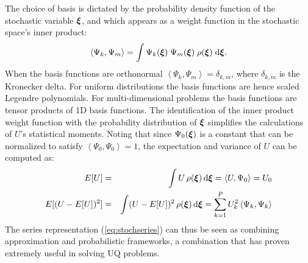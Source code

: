 The choice of basis is dictated by the probability density
function of the stochastic variable $\xxi$, and which appears as a weight
function in the stochastic space's inner product:
\begin{equation}
 \left<\Psi_k,\Psi_m\right> = \int \Psi_k(\xxi) \;\Psi_m(\xxi) \; \rho(\xxi) \; \mbox{d}\xxi.
\end{equation}
When the basis functions are orthonormal $\left<\Psi_k,\Psi_m\right>=\delta_{k,m}$, where
$\delta_{k,m}$ is the Kronecker delta.
For uniform
distributions the basis functions are hence scaled Legendre polynomials.
For multi-dimensional problems the basis functions are
tensor products of 1D basis functions. The identification of the inner product weight function
with the probability distribution of $\xxi$ simplifies the calculations of $U$'s statistical moments.
Noting that since $\Psi_0(\xxi)$ is a constant that can be normalized to satisfy 
$\left<\Psi_0,\Psi_0\right>=1$, the expectation and variance of $U$ can be computed as:
\begin{eqnarray}
 E[U]&=&\int U \, \rho(\xxi) \, \mbox{d}\xxi=\left< U,\Psi_0\right> = U_0 \\
 E[(U-E[U])^2]&=&\int (U-E[U])^2 \, \rho(\xxi) \, \mbox{d}\xxi=\sum_{k=1}^P U_k^2
\left<\Psi_k,\Psi_k\right>
\end{eqnarray}
The series representation (\ref{eq:stochseries}) can thus be seen as
combining approximation and probabilistic frameworks, a combination
that has proven extremely useful in solving UQ
problems.

